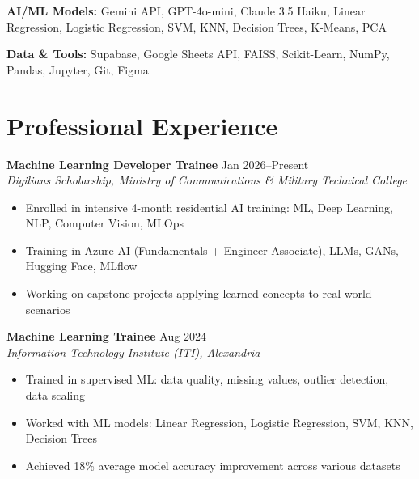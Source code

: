 \documentclass[11pt,a4paper]{article}
\begin{document}
\textbf{AI/ML Models:} Gemini API, GPT-4o-mini, Claude 3.5 Haiku, Linear Regression, Logistic Regression, SVM, KNN, Decision Trees, K-Means, PCA

\vspace{4pt}

\textbf{Data \& Tools:} Supabase, Google Sheets API, FAISS, Scikit-Learn, NumPy, Pandas, Jupyter, Git, Figma

\section*{Professional Experience}

\textbf{Machine Learning Developer Trainee} \hfill Jan 2026--Present\\
\textit{Digilians Scholarship, Ministry of Communications \& Military Technical College}
\begin{itemize}[leftmargin=0.5cm, itemsep=1pt, topsep=2pt, label={-}]
    \item Enrolled in intensive 4-month residential AI training: ML, Deep Learning, NLP, Computer Vision, MLOps
    \item Training in Azure AI (Fundamentals + Engineer Associate), LLMs, GANs, Hugging Face, MLflow
    \item Working on capstone projects applying learned concepts to real-world scenarios
\end{itemize}

\vspace{6pt}

\textbf{Machine Learning Trainee} \hfill Aug 2024\\
\textit{Information Technology Institute (ITI), Alexandria}
\begin{itemize}[leftmargin=0.5cm, itemsep=1pt, topsep=2pt, label={-}]
    \item Trained in supervised ML: data quality, missing values, outlier detection, data scaling
    \item Worked with ML models: Linear Regression, Logistic Regression, SVM, KNN, Decision Trees
    \item Achieved 18\% average model accuracy improvement across various datasets
\end{itemize}

\end{document}

